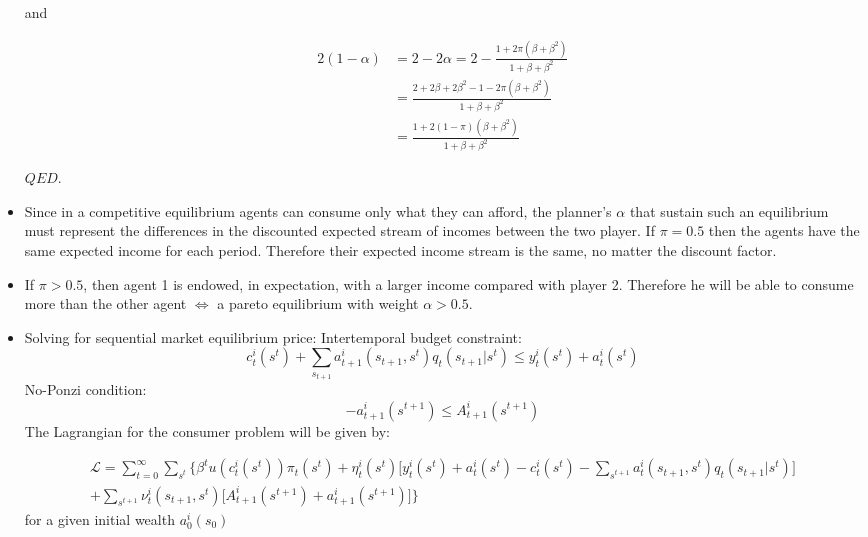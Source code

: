 \documentclass[12pt,a4paper]{article}
\begin{document}
\begin{itemize}
  and

  \begin{align*}
    2(1-\alpha) & = 2 - 2\alpha = 2 -\frac{1 + 2\pi(\beta + \beta^2)}{1 + \beta + \beta^2} \\
    & = \frac{2 + 2\beta + 2 \beta^2 - 1 - 2\pi(\beta + \beta^2)}{1 + \beta + \beta^2} \\
    & = \frac{1 + 2(1 -\pi)(\beta + \beta^2)}{1 + \beta + \beta^2}
  \end{align*}

  $QED$.

  \item Since in a competitive equilibrium agents can consume only what they can afford, the planner's $\alpha$ that sustain such an equilibrium must represent the differences in the discounted expected stream of incomes between the two player. If $\pi = 0.5$ then the agents have the same expected income for each period. Therefore their expected income stream is the same, no matter the discount factor.

  \item If $\pi > 0.5$, then agent 1 is endowed, in expectation, with a larger income compared with player 2. Therefore he will be able to consume more than the other agent $\Leftrightarrow$ a pareto equilibrium with weight $\alpha > 0.5$.

\item Solving for sequential market equilibrium price:
Intertemporal budget constraint: 
\begin{equation*}
    c_{t}^{i}(s^t)+\sum_{s_{t+1}}a_{t+1}^{i}(s_{t+1},s^{t})q_t(s_{t+1}|s^{t})\leq y_{t}^{i}(s^t)+a_{t}^{i}(s^t)
\end{equation*}
No-Ponzi condition: 
\begin{equation*}
    -a_{t+1}^{i}(s^{t+1}) \leq A_{t+1}^{i}(s^{t+1})
\end{equation*}
The Lagrangian for the consumer problem will be given by: 


\begin{multline*}
    \mathcal{L}=\sum_{t=0}^{\infty}\sum_{s^t}\bigg\{
    \beta^t u(c_{t}^{i}(s^t))\pi_t(s^t)+\eta_{t}^{i}(s^t)\bigg[y_{t}^{i}(s^t)+a_{t}^{i}(s^t)-c_{t}^{i}(s^t)-\sum_{s^{t+1}}a_{t}^{i}(s_{t+1},s^t)q_t(s_{t+1}|s^{t})\bigg]\\
    +\sum_{s^{t+1}}\nu_{t}^{i}(s_{t+1},s^t)\bigg[A_{t+1}^{i}(s^{t+1})+a_{t+1}^{i}(s^{t+1})\bigg]\bigg\}
\end{multline*}
for a given initial wealth $a_0^{i}(s_0)$\\


\end{itemize}
\end{document}
